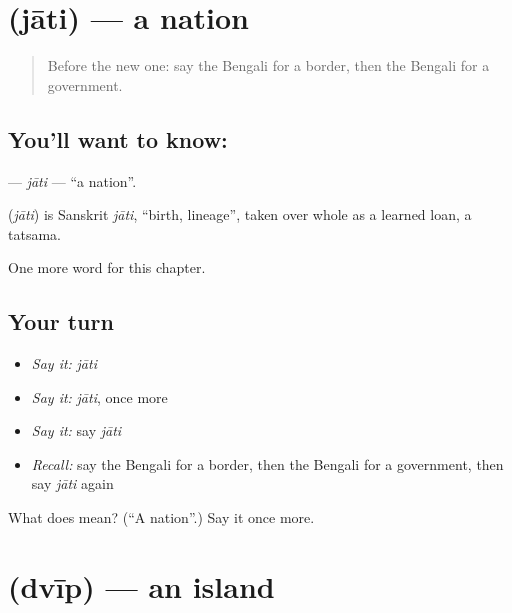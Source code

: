\section[\texorpdfstring{\bn{জাতি} (jāti)}{জাতি (jāti)}]{ (jāti) — a nation}

\label{lesson:BN-C244-jati}



\begin{quote}
Before the new one: say the Bengali for a border, then the Bengali for a government.
\end{quote}

\subsection*{You'll want to know: }
\textbf{} — \emph{jāti} — \textquotedblleft{}a nation\textquotedblright{}.

\begin{cousinweb}
\textbf{} (\emph{jāti}) is Sanskrit \emph{jāti}, \textquotedblleft{}birth, lineage\textquotedblright{}, taken over whole as a learned loan, a tatsama.
\end{cousinweb}

\begin{grammarlens}[title={What you've built}]
One more word for this chapter.
\end{grammarlens}

\subsection*{Your turn}
\begin{itemize}
\raggedright
  \item \emph{Say it:} \emph{jāti}
  \item \emph{Say it:} \emph{jāti}, once more
  \item \emph{Say it:} say \emph{jāti}
  \item \emph{Recall:} say the Bengali for a border, then the Bengali for a government, then say \emph{jāti} again
\end{itemize}

\begin{tcolorbox}[breakable,colback=teal!4,colframe=teal!35!black,title={Before you move on}]
What does  mean? (\textquotedblleft{}A nation\textquotedblright{}.) Say it once more.
\end{tcolorbox}
\section[\texorpdfstring{\bn{দ্বীপ} (dvīp)}{দ্বীপ (dvīp)}]{ (dvīp) — an island}

